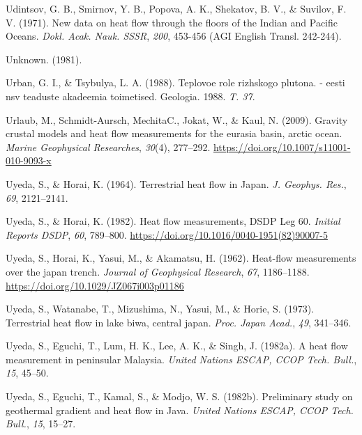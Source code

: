 \begin{CSLReferences}{1}{1}
\leavevmode{}%
Udintsov, G. B., Smirnov, Y. B., Popova, A. K., Shekatov, B. V., \& Suvilov, F. V. (1971). New data on heat flow through the floors of the {Indian and Pacific Oceans}. \emph{Dokl. Acak. Nauk. SSSR}, \emph{200}, 453-456 (AGI English Transl. 242-244).

\leavevmode{}%
Unknown. (1981).

\leavevmode{}%
Urban, G. I., \& Tsybulya, L. A. (1988). Teplovoe role rizhskogo plutona. - eesti nsv teaduste akadeemia toimetised. Geologia. 1988. \emph{T. 37}.

\leavevmode{}%
Urlaub, M., Schmidt-Aursch, MechitaC., Jokat, W., \& Kaul, N. (2009). Gravity crustal models and heat flow measurements for the eurasia basin, arctic ocean. \emph{Marine Geophysical Researches}, \emph{30}(4), 277--292. \url{https://doi.org/10.1007/s11001-010-9093-x}

\leavevmode{}%
Uyeda, S., \& Horai, K. (1964). Terrestrial heat flow in {Japan}. \emph{J. Geophys. Res.}, \emph{69}, 2121--2141.

\leavevmode{}%
Uyeda, S., \& Horai, K. (1982). Heat flow measurements, DSDP {Leg} 60. \emph{Initial Reports DSDP}, \emph{60}, 789--800. \url{https://doi.org/10.1016/0040-1951(82)90007-5}

\leavevmode{}%
Uyeda, S., Horai, K., Yasui, M., \& Akamatsu, H. (1962). Heat-flow measurements over the japan trench. \emph{Journal of Geophysical Research}, \emph{67}, 1186--1188. \url{https://doi.org/10.1029/JZ067i003p01186}

\leavevmode{}%
Uyeda, S., Watanabe, T., Mizushima, N., Yasui, M., \& Horie, S. (1973). Terrestrial heat flow in lake biwa, central japan. \emph{Proc. Japan Acad.}, \emph{49}, 341--346.

\leavevmode{}%
Uyeda, S., Eguchi, T., Lum, H. K., Lee, A. K., \& Singh, J. (1982a). A heat flow measurement in peninsular {Malaysia}. \emph{United Nations ESCAP, CCOP Tech. Bull.}, \emph{15}, 45--50.

\leavevmode{}%
Uyeda, S., Eguchi, T., Kamal, S., \& Modjo, W. S. (1982b). Preliminary study on geothermal gradient and heat flow in {Java}. \emph{United Nations ESCAP, CCOP Tech. Bull.}, \emph{15}, 15--27.


\end{CSLReferences}
